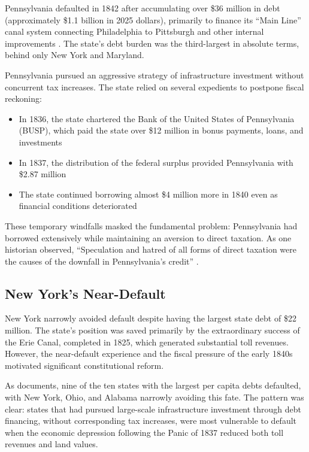 \documentclass[12pt]{article}
\begin{document}
Pennsylvania defaulted in 1842 after accumulating over \$36 million in debt (approximately \$1.1 billion in 2025 dollars), primarily to finance its ``Main Line'' canal system connecting Philadelphia to Pittsburgh and other internal improvements \citep{wallis2004sovereign}. The state's debt burden was the third-largest in absolute terms, behind only New York and Maryland.

Pennsylvania pursued an aggressive strategy of infrastructure investment without concurrent tax increases. The state relied on several expedients to postpone fiscal reckoning:
\begin{itemize}
\item In 1836, the state chartered the Bank of the United States of Pennsylvania (BUSP), which paid the state over \$12 million in bonus payments, loans, and investments
\item In 1837, the distribution of the federal surplus provided Pennsylvania with \$2.87 million
\item The state continued borrowing almost \$4 million more in 1840 even as financial conditions deteriorated
\end{itemize}

These temporary windfalls masked the fundamental problem: Pennsylvania had borrowed extensively while maintaining an aversion to direct taxation. As one historian observed, ``Speculation and hatred of all forms of direct taxation were the causes of the downfall in Pennsylvania's credit'' \citep{wallis2004sovereign}.

\subsection{New York's Near-Default}

New York narrowly avoided default despite having the largest state debt of \$22 million. The state's position was saved primarily by the extraordinary success of the Erie Canal, completed in 1825, which generated substantial toll revenues. However, the near-default experience and the fiscal pressure of the early 1840s motivated significant constitutional reform.

As \citet{wallis2005constitutions} documents, nine of the ten states with the largest per capita debts defaulted, with New York, Ohio, and Alabama narrowly avoiding this fate. The pattern was clear: states that had pursued large-scale infrastructure investment through debt financing, without corresponding tax increases, were most vulnerable to default when the economic depression following the Panic of 1837 reduced both toll revenues and land values.
\end{document}
